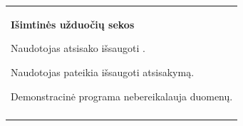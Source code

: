 \begin{center}
\begin{longtable}{|p{\textwidth}|}
    \\
    \textbf{Išimtinės užduočių sekos}
			\newlist{seka}{enumerate}{3}
			\setlist[seka]{label*=\arabic*.,leftmargin=2em}
			\setlist[seka,1]{label=*.\arabic*.,leftmargin=2em}
			\begin{seka}
					\item Naudotojas atsisako išsaugoti \DVCM{}.
					\begin{seka}
						\item Naudotojas pateikia išsaugoti atsisakymą.
						\item Demonstracinė programa nebereikalauja duomenų.
					\end{seka}
			\end{seka}
    \\
    \\ \hline
    \end{longtable}
\end{center}

